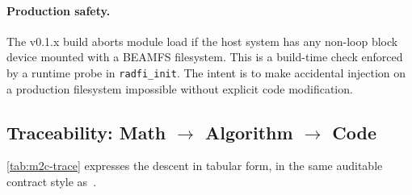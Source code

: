 \paragraph{Production safety.}
The v0.1.x build aborts module load if the host system has any
non-loop block device mounted with a BEAMFS filesystem. This is a build-time check enforced by a runtime probe
in \texttt{radfi\_init}. The intent is to make accidental injection
on a production filesystem impossible without explicit code
modification.

\subsection{Traceability: Math \(\to\) Algorithm \(\to\) Code}

\cref{tab:m2c-trace} expresses the descent in tabular form, in the
same auditable contract style
as~\cite[Table~II]{desbrieres2026beamfsv1}.

